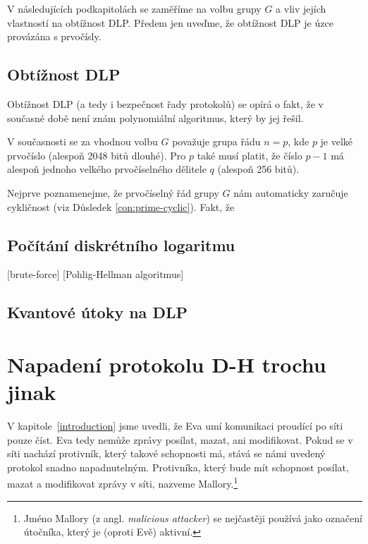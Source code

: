 \documentclass[
  program=infoi,
  biblatex,
  figures=false,
  glossaries,
  index
]{kidiplom}
\begin{document}

        V následujících podkapitolách se zaměříme na volbu grupy $G$ a vliv jejích
        vlastností na obtížnost DLP. Předem jen uveďme, že obtížnost DLP je úzce provázána s prvočísly.

        \subsection{Obtížnost DLP}\label{sub:discrete-log-complexity}

        Obtížnost DLP (a tedy i bezpečnost řady protokolů) se opírá o fakt, že v současné době není znám polynomiální
        algoritmus, který by jej řešil.




        V současnosti se za vhodnou volbu $G$ považuje grupa řádu $n=p$, kde
        $p$ je velké prvočíslo (alespoň 2048 bitů dlouhé). Pro $p$ také musí platit, že číslo $p-1$ má alespoň
        jednoho velkého prvočíselného dělitele $q$ (alespoň 256 bitů).

        Nejprve poznamenejme, že prvočíselný řád grupy $G$ nám automaticky zaručuje cykličnost (viz Důsledek \ref{con:prime-cyclic}).
        Fakt, že 









        \subsection{Počítání diskrétního logaritmu}\label{subsec:counting-discrete-log}

        [brute-force]
        [Pohlig-Hellman algoritmus]

        \subsection{Kvantové útoky na DLP}


    

\section{Napadení protokolu D-H trochu jinak}


    V kapitole~\ref{introduction} jsme uvedli, že Eva umí komunikaci proudící po síti pouze číst. Eva tedy nemůže zprávy posílat, mazat, ani modifikovat.
    Pokud se v síti nachází protivník, který takové schopnosti má, stává se námi uvedený protokol snadno napadnutelným. Protivníka, který bude mít
    schopnost posílat, mazat a modifikovat zprávy v síti, nazveme Mallory.\footnote{Jméno Mallory (z angl. \emph{malicious attacker}) se nejčastěji používá jako
    označení útočníka, který je (oproti Evě) aktivní.}
\end{document}
